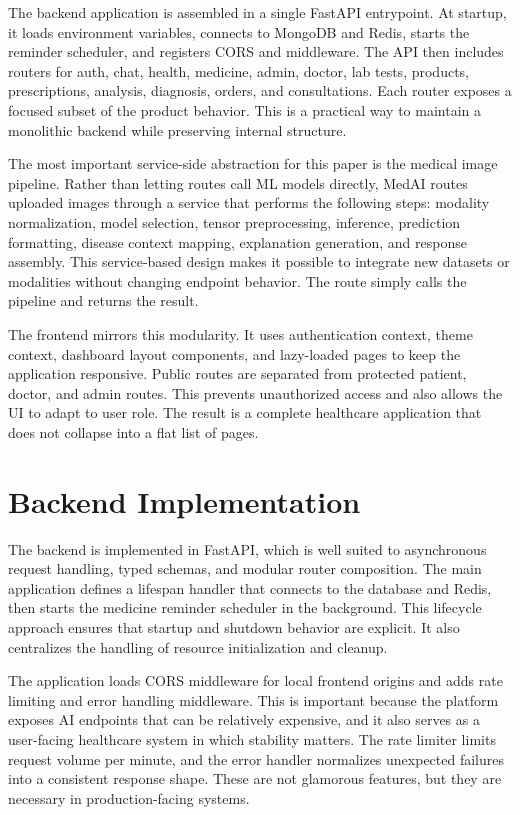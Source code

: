 \documentclass[conference]{IEEEtran}
\begin{document}
The backend application is assembled in a single FastAPI entrypoint. At startup, it loads environment variables, connects to MongoDB and Redis, starts the reminder scheduler, and registers CORS and middleware. The API then includes routers for auth, chat, health, medicine, admin, doctor, lab tests, products, prescriptions, analysis, diagnosis, orders, and consultations. Each router exposes a focused subset of the product behavior. This is a practical way to maintain a monolithic backend while preserving internal structure.

The most important service-side abstraction for this paper is the medical image pipeline. Rather than letting routes call ML models directly, MedAI routes uploaded images through a service that performs the following steps: modality normalization, model selection, tensor preprocessing, inference, prediction formatting, disease context mapping, explanation generation, and response assembly. This service-based design makes it possible to integrate new datasets or modalities without changing endpoint behavior. The route simply calls the pipeline and returns the result.

The frontend mirrors this modularity. It uses authentication context, theme context, dashboard layout components, and lazy-loaded pages to keep the application responsive. Public routes are separated from protected patient, doctor, and admin routes. This prevents unauthorized access and also allows the UI to adapt to user role. The result is a complete healthcare application that does not collapse into a flat list of pages.

\section{Backend Implementation}
The backend is implemented in FastAPI, which is well suited to asynchronous request handling, typed schemas, and modular router composition. The main application defines a lifespan handler that connects to the database and Redis, then starts the medicine reminder scheduler in the background. This lifecycle approach ensures that startup and shutdown behavior are explicit. It also centralizes the handling of resource initialization and cleanup.

The application loads CORS middleware for local frontend origins and adds rate limiting and error handling middleware. This is important because the platform exposes AI endpoints that can be relatively expensive, and it also serves as a user-facing healthcare system in which stability matters. The rate limiter limits request volume per minute, and the error handler normalizes unexpected failures into a consistent response shape. These are not glamorous features, but they are necessary in production-facing systems.
\end{document}
